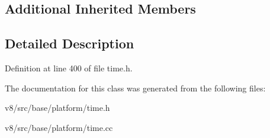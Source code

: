 \subsection*{Additional Inherited Members}


\subsection{Detailed Description}


Definition at line 400 of file time.\+h.



The documentation for this class was generated from the following files\+:\begin{DoxyCompactItemize}
\item 
v8/src/base/platform/time.\+h\item 
v8/src/base/platform/time.\+cc\end{DoxyCompactItemize}
